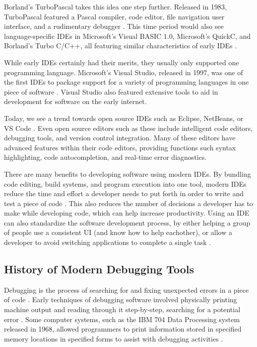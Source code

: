 \documentclass{article}
\begin{document}
Borland's TurboPascal takes this idea one step further. Released in 1983, TurboPascal featured a Pascal compiler, code editor, file navigation user interface, and a rudimentary debugger \cite{Gajic_2017, Intersimone_2010, Wadlow_1984}. This time period would also see language-specific IDEs in Microsoft's Visual BASIC 1.0, Microsoft's QuickC, and Borland's Turbo C/C++, all featuring similar characteristics of early IDEs \cite{Burgwin_2013, Plant_Murrell_2007, Posch_2023, Forer_Petreley_1991}.

While early IDEs certainly had their merits, they usually only supported one programming language. Microsoft's Visual Studio, released in 1997, was one of the first IDEs to package support for a variety of programming languages in one piece of software \cite{Microsoft_1997}. Visual Studio also featured extensive tools to aid in development for software on the early internet. 

Today, we see a trend towards open source IDEs such as Eclipse, NetBeans, or VS Code \cite{Apache_2023, EclipseFoundation_2023, Microsoft_2023a}. Even open source editors such as these include intelligent code editors, debugging tools, and version control integration. Many of these editors have advanced features within their code editors, providing functions such syntax highlighting, code autocompletion, and real-time error diagnostics. 

There are many benefits to developing software using modern IDEs. By bundling code editing, build systems, and program execution into one tool, modern IDEs reduce the time and effort a developer needs to put forth in order to write and test a piece of code \cite{Gillis_Silverthorne_2018}. This also reduces the number of decisions a developer has to make while developing code, which can help increase productivity. Using an IDE can also standardize the software development process, by either helping a group of people use a consistent UI (and know how to help eachother), or allow a developer to avoid switching applications to complete a single task \cite{Veracode_2020}. 

\subsection{History of Modern Debugging Tools}

Debugging is the process of searching for and fixing unexpected errors in a piece of code \cite{AWS_2023}. Early techniques of debugging software involved physically printing machine output and reading through it step-by-step, searching for a potential error \cite{RevDeBug_2020}. Some computer systems, such as the IBM 704 Data Processing system released in 1968, allowed programmers to print information stored in specified memory locations in specified forms to assist with debugging activities \cite{MIT_1957, IBMArchives_2023}. 
\end{document}
